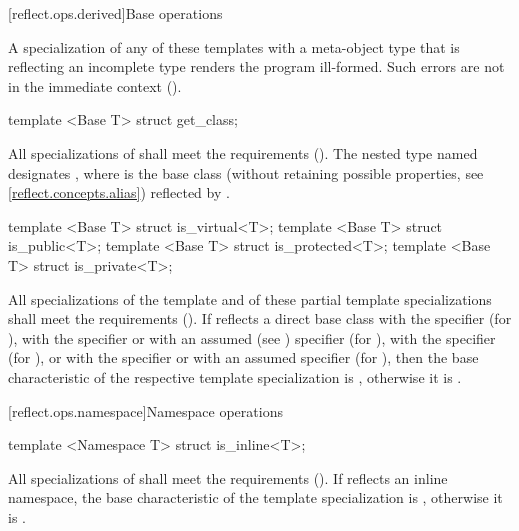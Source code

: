 [reflect.ops.derived]{Base operations}

\begin{std.txt}\color{addclr}
A specialization of any of these templates with a meta-object type that is reflecting an incomplete type renders the program ill-formed.
      Such errors are not in the immediate context ().

\begin{itemdecl}
template <Base T> struct get_class;
\end{itemdecl}

\begin{itemdescr}
\pnum
All specializations of  shall meet the  requirements (). The nested type named  designates , where  is the base class (without retaining possible  properties, see \ref{reflect.concepts.alias}) reflected by .
\end{itemdescr}

\begin{itemdecl}
template <Base T> struct is_virtual<T>;
template <Base T> struct is_public<T>;
template <Base T> struct is_protected<T>;
template <Base T> struct is_private<T>;
\end{itemdecl}

\begin{itemdescr}
\pnum
All specializations of the template and of these partial template specializations shall meet the  requirements (). If  reflects a direct base class with the  specifier (for ), with the  specifier or with an assumed (see )  specifier (for ), with the  specifier (for ), or with the  specifier or with an assumed  specifier (for ), then the base characteristic of the respective template specialization is , otherwise it is .
\end{itemdescr}
\end{std.txt}

[reflect.ops.namespace]{Namespace operations}

\begin{std.txt}\color{addclr}

\begin{itemdecl}
template <Namespace T> struct is_inline<T>;
\end{itemdecl}

\begin{itemdescr}
\pnum
All specializations of  shall meet the  requirements (). If  reflects an inline namespace, the base characteristic of the template specialization is , otherwise it is .

\end{itemdescr}
\end{std.txt}

